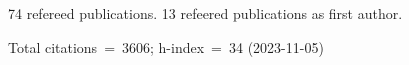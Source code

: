 74 refereed publications. 13 refeered publications as first author.

Total citations~=~3606; h-index~=~34 (2023-11-05)